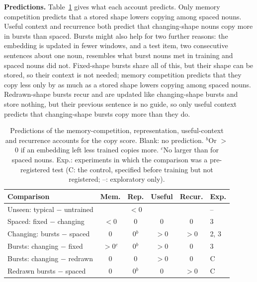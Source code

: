 \documentclass{article}
\begin{document}
\textbf{Predictions.} Table~\ref{tab:pred} gives what each account predicts. Only memory competition predicts that a stored shape lowers copying among spaced nouns. Useful context and recurrence both predict that changing-shape nouns copy more in bursts than spaced. Bursts might also help for two further reasons: the embedding is updated in fewer windows, and a test item, two consecutive sentences about one noun, resembles what burst nouns met in training and spaced nouns did not. Fixed-shape bursts share all of this, but their shape can be stored, so their context is not needed; memory competition predicts that they copy less only by as much as a stored shape lowers copying among spaced nouns. Redrawn-shape bursts recur and are updated like changing-shape bursts and store nothing, but their previous sentence is no guide, so only useful context predicts that changing-shape bursts copy more than they do.

\begin{table}[t]
\centering
\small
\setlength{\tabcolsep}{1.5pt}
\begin{tabular}{@{}>{\raggedright\arraybackslash}p{}ccccl@{}}
\toprule
Comparison & Mem. & Rep. & Useful & Recur. & Exp. \\
\midrule
Unseen: typical $-$ untrained & & $<$0 & & & -- \\
Spaced: fixed $-$ changing & $<$0 & 0 & 0 & 0 & 3 \\
Changing: bursts $-$ spaced & 0 & 0$^b$ & $>$0 & $>$0 & 2, 3 \\
Bursts: changing $-$ fixed & $>$0$^c$ & 0$^b$ & $>$0 & 0 & 3 \\
Bursts: changing $-$ redrawn & 0 & 0 & $>$0 & 0 & C \\
Redrawn bursts $-$ spaced & 0 & 0$^b$ & 0 & $>$0 & C \\
\bottomrule
\end{tabular}
\caption{Predictions of the memory-competition, representation, useful-context and recurrence accounts for the copy score. Blank: no prediction. $^b$Or $>$0 if an embedding left less trained copies more. $^c$No larger than for spaced nouns. Exp.: experiments in which the comparison was a pre-registered test (C: the control, specified before training but not registered; --: exploratory only).}
\label{tab:pred}
\end{table}
\end{document}
